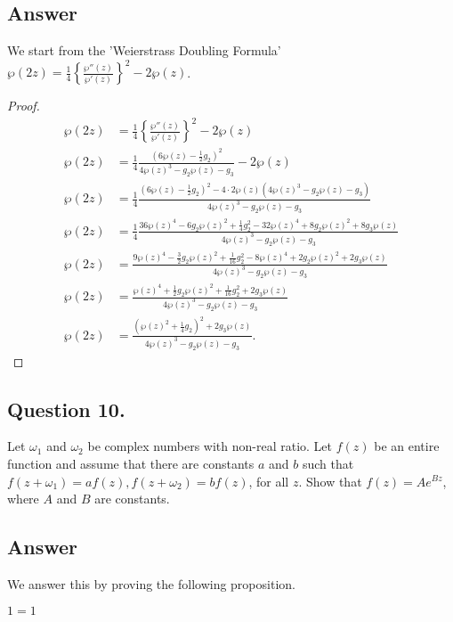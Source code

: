 \subsection*{Answer}
\noindent
We start from the 'Weierstrass Doubling Formula' $\wp(2z)= \frac{1}{4}\left\{ \frac{\wp''(z)}{\wp'(z)}\right\}^2-2\wp(z)$.


\begin{proof}
    \begin{align*}
        \wp(2z) &= \frac{1}{4}\left\{ \frac{\wp''(z)}{\wp'(z)}\right\}^2-2\wp(z) \\
        \wp(2z) &= \frac{1}{4} \frac{(6\wp(z)-\frac{1}{2}g_2)^2}{4 \wp(z)^3 -g_2\wp(z)-g_3}-2\wp(z) \\
        \wp(2z) &= \frac{1}{4} \frac{(6\wp(z)-\frac{1}{2}g_2)^2-4 \cdot 2\wp(z)(4 \wp(z)^3 -g_2\wp(z)-g_3) }{4 \wp(z)^3 -g_2\wp(z)-g_3} \\
        \wp(2z) &= \frac{1}{4} \frac{36\wp(z)^4 - 6g_2 \wp(z)^2 + \frac{1}{4}g_2^2 -32\wp(z)^4 + 8g_2\wp(z)^2 + 8g_3\wp(z) }{4 \wp(z)^3 -g_2\wp(z)-g_3} \\
        \wp(2z) &= \frac{9\wp(z)^4 - \frac{3}{2}g_2 \wp(z)^2 + \frac{1}{16}g_2^2 -8\wp(z)^4 + 2g_2\wp(z)^2 + 2g_3\wp(z) }{4 \wp(z)^3 -g_2\wp(z)-g_3} \\
        \wp(2z) &= \frac{\wp(z)^4 + \frac{1}{2}g_2 \wp(z)^2 + \frac{1}{16}g_2^2 + 2g_3\wp(z) }{4 \wp(z)^3 -g_2\wp(z)-g_3} \\
        \wp(2z) &= \frac{(\wp(z)^2 + \frac{1}{4}g_2)^2+2g_3\wp(z)}{4\wp(z)^3-g_2\wp(z)-g_3}.
    \end{align*}
\end{proof}


\subsection{Question 10.}
\noindent
Let $\omega_1$ and $\omega_2$ be complex numbers with non-real ratio. Let $f(z)$ be an entire function and
assume that there are constants $a$ and $b$ such that $f(z+\omega_1)=a f(z), f(z+\omega_2)=b f(z)$, for all $z$.
Show that $f(z) = A e^{Bz}$, where $A$ and $B$ are constants.

\subsection*{Answer}
\noindent
We answer this by proving the following proposition.

\begin{proposition}
    $1=1$
\end{proposition}

